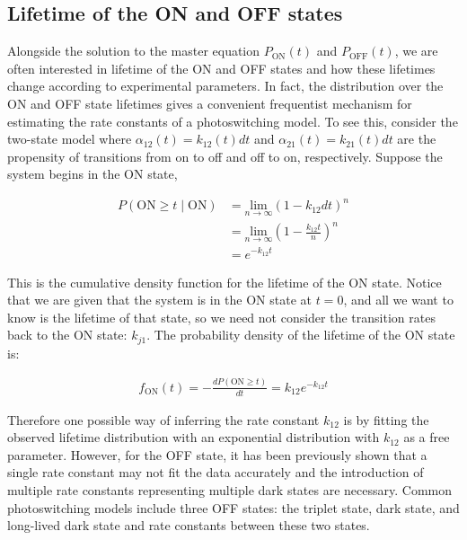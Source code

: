 \documentclass{ucetd}
\begin{document}
\begin{appendices}



\subsection{Lifetime of the ON and OFF states}

Alongside the solution to the master equation $P_{\mathrm{ON}}(t)$ and $P_{\mathrm{OFF}}(t)$, we are often interested in lifetime of the ON and OFF states and how these lifetimes change according to experimental parameters. In fact, the distribution over the ON and OFF state lifetimes gives a convenient frequentist mechanism for estimating the rate constants of a photoswitching model. To see this, consider the two-state model where $\alpha_{12}(t) = k_{12}(t)dt$ and $\alpha_{21}(t) = k_{21}(t)dt$ are the propensity of transitions from on to off and off to on, respectively. Suppose the system begins in the ON state, 

\begin{align*}
P(\mathrm{ON} \geq t \; | \;\mathrm{ON}) &= \underset{n\rightarrow\infty}{\mathrm{lim}}\left(1-k_{12}dt\right)^{n}\\
&= \underset{n\rightarrow\infty}{\mathrm{lim}}\left(1-\frac{k_{12}t}{n}\right)^{n}\\
&= e^{-k_{12}t}
\end{align*}

This is the cumulative density function for the lifetime of the ON state. Notice that we are given that the system is in the ON state at $t=0$, and all we want to know is the lifetime of that state, so we need not consider the transition rates back to the ON state: $k_{j1}$. The probability density of the lifetime of the ON state is: 

\begin{align*}
f_{\mathrm{ON}}(t) = -\frac{dP(\mathrm{ON} \geq t)}{dt} = k_{12}e^{-k_{12}t}
\end{align*}

Therefore one possible way of inferring the rate constant $k_{12}$ is by fitting the observed lifetime distribution with an exponential distribution with $k_{12}$ as a free parameter. However, for the OFF state, it has been previously shown that a single rate constant may not fit the data accurately and the introduction of multiple rate constants representing multiple dark states are necessary. Common photoswitching models include three OFF states: the triplet state, dark state, and long-lived dark state and rate constants between these two states.


\end{appendices}
\end{document}
